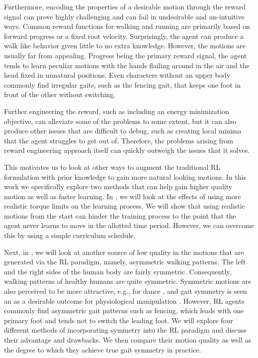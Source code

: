 Furthermore, encoding the properties of a desirable motion through the reward signal can prove highly challenging and can fail in undesirable and un-intuitive ways. Common reward functions for walking and running are primarily based on forward progress or a fixed root velocity. Surprisingly, the agent can produce a walk like behavior given little to no extra knowledge. However, the motions are usually far from appealing. Progress being the primary reward signal, the agent tends to learn peculiar motions with the hands flailing around in the air and the head fixed in unnatural positions. Even characters without an upper body commonly find irregular gaits, such as the fencing gait, that keeps one foot in front of the other without switching.

Further engineering the reward, such as including an energy minimization objective, can alleviate some of the problems to some extent, but it can also produce other issues that are difficult to debug, such as creating local minima that the agent struggles to get out of. Therefore, the problems arising from reward engineering approach itself can quickly outweigh the issues that it solves.

This motivates us to look at other ways to augment the traditional \ac{RL} formulation with prior knowledge to gain more natural looking motions. In this work we specifically explore two methods that can help gain higher quality motion as well as faster learning. In , we will look at the effects of using more realistic torque limits on the learning process. We will show that using realistic motions from the start can hinder the training process to the point that the agent never learns to move in the allotted time period. However, we can overcome this by using a simple curriculum schedule.

Next, in , we will look at another source of low quality in the motions that are generated via the \ac{RL} paradigm, namely, asymmetric walking patterns. The left and the right sides of the human body are fairly symmetric. Consequently, walking patterns of healthy humans are quite symmetric. Symmetric motions are also perceived to be more attractive, e.g., for dance \cite{danceSymmetry}, and gait symmetry is seen an as a desirable outcome for physiological manipulation \cite{robinson1987use}. However, \ac{RL} agents commonly find asymmetric gait patterns such as fencing, which leads with one primary foot and tends not to switch the leading foot. We will explore four different methods of incorporating symmetry into the \ac{RL} paradigm and discuss their advantage and drawbacks. We then compare their motion quality as well as the degree to which they achieve true gait symmetry in practice.